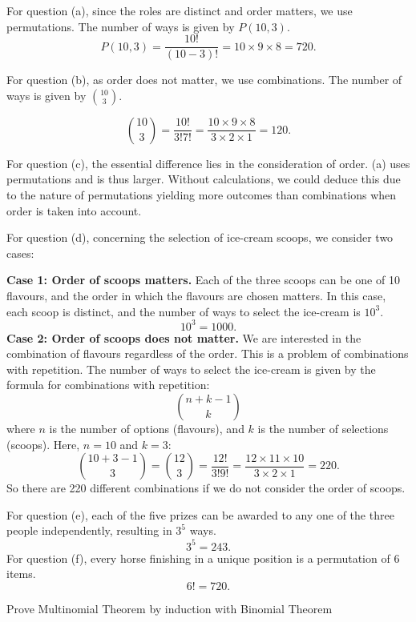         \begin{solution}
            For question (a), since the roles are distinct and order matters, we use permutations. The number of ways is given by \( P(10, 3) \).
            \[ P(10, 3) = \frac{10!}{(10-3)!} = 10 \times 9 \times 8 = 720. \]

            For question (b), as order does not matter, we use combinations. The number of ways is given by \( \binom{10}{3} \).

         \[ \binom{10}{3} = \frac{10!}{3!7!} = \frac{10 \times 9 \times 8}{3 \times 2 \times 1} = 120. \]

         For question (c), the essential difference lies in the consideration of order. (a) uses permutations and is thus larger. Without calculations, we could deduce this due to the nature of permutations yielding more outcomes than combinations when order is taken into account.

         For question (d), concerning the selection of ice-cream scoops, we consider two cases:

        \textbf{Case 1: Order of scoops matters.} Each of the three scoops can be one of 10 flavours, and the order in which the flavours are chosen matters. In this case, each scoop is distinct, and the number of ways to select the ice-cream is \( 10^3 \).
        \[ 10^3 = 1000. \]
        \textbf{Case 2: Order of scoops does not matter.} We are interested in the combination of flavours regardless of the order. This is a problem of combinations with repetition. The number of ways to select the ice-cream is given by the formula for combinations with repetition:
        \[ \binom{n + k - 1}{k} \]
        where \( n \) is the number of options (flavours), and \( k \) is the number of selections (scoops). Here, \( n = 10 \) and \( k = 3 \):
        \[ \binom{10 + 3 - 1}{3} = \binom{12}{3} = \frac{12!}{3!9!} = \frac{12 \times 11 \times 10}{3 \times 2 \times 1} = 220. \]
        So there are 220 different combinations if we do not consider the order of scoops.

        For question (e), each of the five prizes can be awarded to any one of the three people independently, resulting in \( 3^5 \) ways.
        \[ 3^5 = 243. \]
        For question (f), every horse finishing in a unique position is a permutation of 6 items.
        \[ 6! = 720. \]
        \end{solution}
        \begin{exercise}
            Prove Multinomial Theorem by induction with Binomial Theorem
        \end{exercise}
